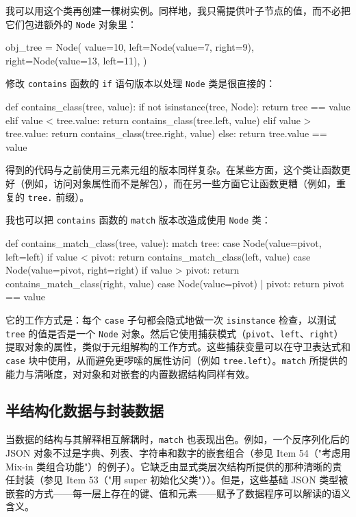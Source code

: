 我可以用这个类再创建一棵树实例。同样地，我只需提供叶子节点的值，而不必把它们包进额外的 \verb|Node| 对象里：

\begin{codebox}[python]
obj_tree = Node(
    value=10,
    left=Node(value=7, right=9),
    right=Node(value=13, left=11),
)
\end{codebox}

修改 \verb|contains| 函数的 \verb|if| 语句版本以处理 \verb|Node| 类是很直接的：

\begin{codebox}[python]
def contains_class(tree, value):
    if not isinstance(tree, Node):
        return tree == value
    elif value < tree.value:
        return contains_class(tree.left, value)
    elif value > tree.value:
        return contains_class(tree.right, value)
    else:
        return tree.value == value
\end{codebox}

得到的代码与之前使用三元素元组的版本同样复杂。在某些方面，这个类让函数更好（例如，访问对象属性而不是解包），而在另一些方面它让函数更糟（例如，重复的 \verb|tree.| 前缀）。

我也可以把 \verb|contains| 函数的 \verb|match| 版本改造成使用 \verb|Node| 类：

\begin{codebox}[python]
def contains_match_class(tree, value):
    match tree:
        case Node(value=pivot, left=left) if value < pivot:
            return contains_match_class(left, value)
        case Node(value=pivot, right=right) if value > pivot:
            return contains_match_class(right, value)
        case Node(value=pivot) | pivot:
            return pivot == value
\end{codebox}

它的工作方式是：每个 \verb|case| 子句都会隐式地做一次 \verb|isinstance| 检查，以测试 \verb|tree| 的值是否是一个 \verb|Node| 对象。然后它使用捕获模式（\verb|pivot|、\verb|left|、\verb|right|）提取对象的属性，类似于元组解构的工作方式。这些捕获变量可以在守卫表达式和 \verb|case| 块中使用，从而避免更啰嗦的属性访问（例如 \verb|tree.left|）。\verb|match| 所提供的能力与清晰度，对对象和对嵌套的内置数据结构同样有效。

\subsection{半结构化数据与封装数据}

当数据的结构与其解释相互解耦时，\verb|match| 也表现出色。例如，一个反序列化后的 JSON 对象不过是字典、列表、字符串和数字的嵌套组合（参见 Item 54（"考虑用 Mix-in 类组合功能"）的例子）。它缺乏由显式类层次结构所提供的那种清晰的责任封装（参见 Item 53（"用 super 初始化父类"））。但是，这些基础 JSON 类型被嵌套的方式——每一层上存在的键、值和元素——赋予了数据程序可以解读的语义含义。

